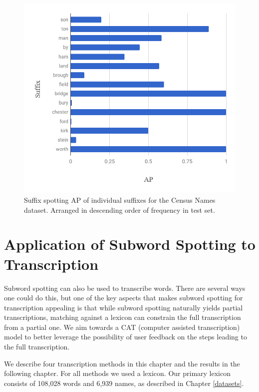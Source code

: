 \documentclass[ms,electronic,twosidetoc,letterpaper,chaptercenter,parttop,lof,lot]{byumsphd}
\begin{document}
\begin{figure}
    \centering
    \includegraphics[width=.75\textwidth]{suffix_names_ap}
    \caption{Suffix spotting AP of individual suffixes for the Census Names dataset. Arranged in descending order of frequency in test set.}
    \label{fig:names_suffix}
\end{figure}





\chapter{Application of Subword Spotting to Transcription}\label{transcription}

Subword spotting can also be used to transcribe words. There are several ways one could do this, but one of the key aspects that makes subword spotting for transcription appealing is that while subword spotting naturally yields partial transcriptions, matching against a lexicon can constrain the full transcription from a partial one. We aim towards a CAT (computer assisted transcription) model to better leverage the possibility of user feedback on the steps leading to the full transcription.

We describe four transcription methods in this chapter and the results in the following chapter.
For all methods we used a lexicon. Our primary lexicon consists of 108,028 words and 6,939 names, as described in Chapter \ref{datasets}.
\end{document}

